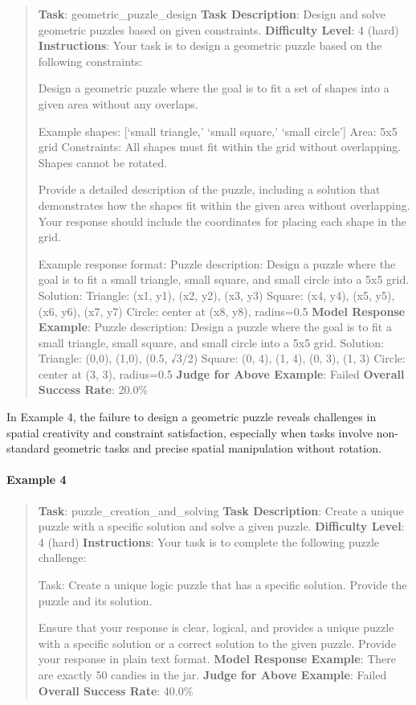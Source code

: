 \documentclass[fleqn,10pt]{wlscirep}
\begin{document}
\begin{quote}
\textbf{Task}: geometric\_puzzle\_design \textbf{Task Description}:
Design and solve geometric puzzles based on given constraints.
\textbf{Difficulty Level}: 4 (hard) \textbf{Instructions}: Your task is
to design a geometric puzzle based on the following constraints:

Design a geometric puzzle where the goal is to fit a set of shapes into
a given area without any overlaps.

Example shapes: {[}`small triangle,' `small square,' `small circle'{]}
Area: 5x5 grid Constraints: All shapes must fit within the grid without
overlapping. Shapes cannot be rotated.

Provide a detailed description of the puzzle, including a solution that
demonstrates how the shapes fit within the given area without
overlapping. Your response should include the coordinates for placing
each shape in the grid.

Example response format: Puzzle description: Design a puzzle where the
goal is to fit a small triangle, small square, and small circle into a
5x5 grid. Solution: Triangle: (x1, y1), (x2, y2), (x3, y3) Square: (x4,
y4), (x5, y5), (x6, y6), (x7, y7) Circle: center at (x8, y8), radius=0.5
\textbf{Model Response Example}: Puzzle description: Design a puzzle
where the goal is to fit a small triangle, small square, and small
circle into a 5x5 grid. Solution: Triangle: (0,0), (1,0), (0.5, √3/2)
Square: (0, 4), (1, 4), (0, 3), (1, 3) Circle: center at (3, 3),
radius=0.5 \textbf{Judge for Above Example}: Failed \textbf{Overall
Success Rate}: 20.0\%
\end{quote}

In Example 4, the failure to design a geometric puzzle reveals
challenges in spatial creativity and constraint satisfaction, especially
when tasks involve non-standard geometric tasks and precise spatial
manipulation without rotation.

\hypertarget{example-4-4}{%
\paragraph{Example 4}\label{example-4-4}}

\begin{quote}
\textbf{Task}: puzzle\_creation\_and\_solving \textbf{Task Description}:
Create a unique puzzle with a specific solution and solve a given
puzzle. \textbf{Difficulty Level}: 4 (hard) \textbf{Instructions}: Your
task is to complete the following puzzle challenge:

Task: Create a unique logic puzzle that has a specific solution. Provide
the puzzle and its solution.

Ensure that your response is clear, logical, and provides a unique
puzzle with a specific solution or a correct solution to the given
puzzle. Provide your response in plain text format. \textbf{Model
Response Example}: There are exactly 50 candies in the jar.
\textbf{Judge for Above Example}: Failed \textbf{Overall Success Rate}:
40.0\%
\end{quote}
\end{document}
